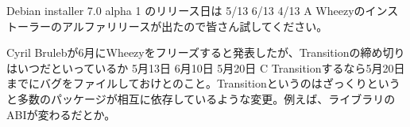 %

\santaku
{Debian installer 7.0 alpha 1 のリリース日は}
{5/13}
{6/13}
{4/13}
{A}
{Wheezyのインストーラーのアルファリリースが出たので皆さん試してください。}

\santaku
{Cyril Brulebが6月にWheezyをフリーズすると発表したが、Transitionの締め切りはいつだといっているか}
{5月13日}
{6月10日}
{5月20日}
{C}
{Transitionするなら5月20日までにバグをファイルしておけとのこと。Transitionというのはざっくりというと多数のパッケージが相互に依存しているような変更。例えば、ライブラリのABIが変わるだとか。}
